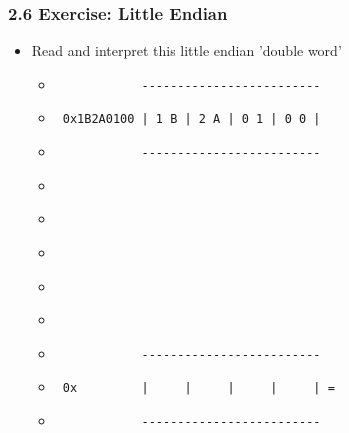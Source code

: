 \begin{frame}[fragile]
  \frametitle{2.6 Exercise: Little Endian}
    \begin{itemize}
        \item[] Read and interpret this little endian 'double word'
            \begin{itemize}
                \item[] \begin{verbatim}            ------------------------- \end{verbatim}
                \item[] \begin{verbatim} 0x1B2A0100 | 1 B | 2 A | 0 1 | 0 0 | \end{verbatim}
                \item[] \begin{verbatim}            ------------------------- \end{verbatim}
                \item[] \begin{verbatim}                                      \end{verbatim}
                \item[] \begin{verbatim}                                      \end{verbatim}
                \item[] \begin{verbatim}                                      \end{verbatim}
                \item[] \begin{verbatim}                                      \end{verbatim}
                \item[] \begin{verbatim}                                      \end{verbatim}
                \item[] \begin{verbatim}            ------------------------- \end{verbatim}
                \item[] \begin{verbatim} 0x         |     |     |     |     | =  \end{verbatim}
                \item[] \begin{verbatim}            ------------------------- \end{verbatim}
            \end{itemize}
    \end{itemize}
\end{frame}


